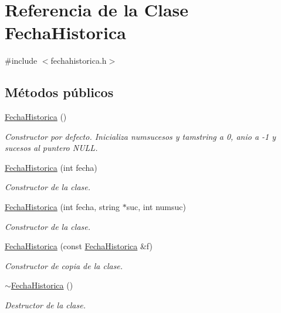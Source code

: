 \hypertarget{classFechaHistorica}{}\section{Referencia de la Clase Fecha\+Historica}
\label{classFechaHistorica}


{\ttfamily \#include $<$fechahistorica.\+h$>$}

\subsection*{Métodos públicos}
\begin{DoxyCompactItemize}
\item 
\hyperlink{classFechaHistorica_a35baa09e365240e567049a7e33a7c209}{Fecha\+Historica} ()
\begin{DoxyCompactList}\small\item\em Constructor por defecto. Inicializa numsucesos y tamstring a 0, anio a -\/1 y sucesos al puntero N\+U\+LL. \end{DoxyCompactList}\item 
\hyperlink{classFechaHistorica_a3004213c2f6e02a621bf5e0a1b438779}{Fecha\+Historica} (int fecha)
\begin{DoxyCompactList}\small\item\em Constructor de la clase. \end{DoxyCompactList}\item 
\hyperlink{classFechaHistorica_a0e18a1174c82e1352fead3a47c3d560e}{Fecha\+Historica} (int fecha, string $\ast$suc, int numsuc)
\begin{DoxyCompactList}\small\item\em Constructor de la clase. \end{DoxyCompactList}\item 
\hyperlink{classFechaHistorica_a40a9c133a139d41bf84406e09022feaf}{Fecha\+Historica} (const \hyperlink{classFechaHistorica}{Fecha\+Historica} \&f)
\begin{DoxyCompactList}\small\item\em Constructor de copia de la clase. \end{DoxyCompactList}\item 
\hyperlink{classFechaHistorica_a634de6e216261ee47721922692d2934f}{$\sim$\+Fecha\+Historica} ()
\begin{DoxyCompactList}\small\item\em Destructor de la clase. \end{DoxyCompactList}\item 

\end{DoxyCompactItemize}
